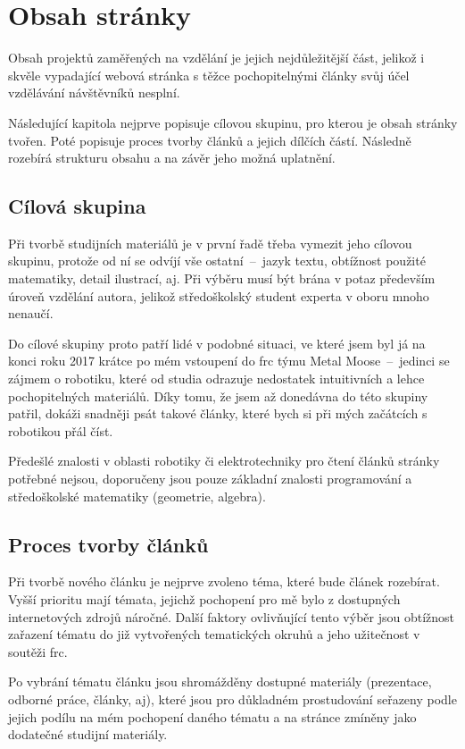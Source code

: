 \documentclass[a4paper, 12pt]{article}
\begin{document}
  \section{Obsah stránky}
  Obsah projektů zaměřených na vzdělání je jejich nejdůležitější část, jelikož i skvěle vypadající webová stránka s těžce pochopitelnými články svůj účel vzdělávání návštěvníků nesplní.

  Následující kapitola nejprve popisuje cílovou skupinu, pro kterou je obsah stránky tvořen. Poté popisuje proces tvorby článků a jejich dílčích částí. Následně rozebírá strukturu obsahu a na závěr jeho možná uplatnění.


  \subsection{Cílová skupina}
  Při tvorbě studijních materiálů je v první řadě třeba vymezit jeho cílovou skupinu, protože od ní se odvíjí vše ostatní~--~jazyk textu, obtížnost použité matematiky, detail ilustrací, aj. Při výběru musí být brána v potaz především úroveň vzdělání autora, jelikož středoškolský student experta v oboru mnoho nenaučí.

  Do cílové skupiny proto patří lidé v podobné situaci, ve které jsem byl já na konci roku 2017 krátce po mém vstoupení do \gls{frc} týmu Metal Moose~--~jedinci se zájmem o robotiku, které od studia odrazuje nedostatek intuitivních a lehce pochopitelných materiálů. Díky tomu, že jsem až donedávna do této skupiny patřil, dokáži snadněji psát takové články, které bych si při mých začátcích s robotikou přál číst.

  Předešlé znalosti v oblasti robotiky či elektrotechniky pro čtení článků stránky potřebné nejsou, doporučeny jsou pouze základní znalosti programování a středoškolské matematiky (geometrie, algebra).


  \subsection{Proces tvorby článků} \label{sec:Proces tvorby článků}
  Při tvorbě nového článku je nejprve zvoleno téma, které bude článek rozebírat. Vyšší prioritu mají témata, jejichž pochopení pro mě bylo z dostupných internetových zdrojů náročné. Další faktory ovlivňující tento výběr jsou obtížnost zařazení tématu do již vytvořených tematických okruhů a jeho užitečnost v soutěži \gls{frc}.

  Po vybrání tématu článku jsou shromážděny dostupné materiály (prezentace, odborné práce, články, aj), které jsou pro důkladném prostudování seřazeny podle jejich podílu na mém pochopení daného tématu a na stránce zmíněny jako dodatečné studijní materiály.
\end{document}
